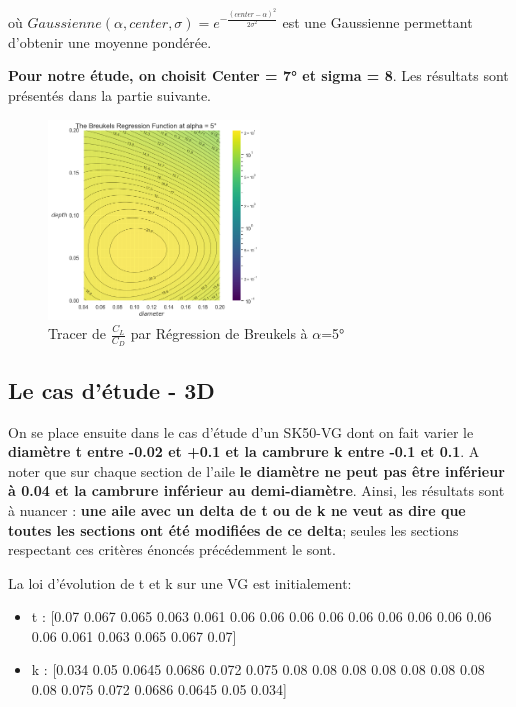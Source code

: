 \documentclass[conference]{IEEEtran}
\begin{document}
    où $Gaussienne(\alpha, center, \sigma) = e^{-\frac{(center - \alpha)^2}{2\sigma^2}}$ est une Gaussienne permettant d'obtenir une moyenne pondérée. 

\textbf{Pour notre étude, on choisit Center = 7° et sigma = 8}. Les résultats sont présentés dans la partie suivante.
\begin{figure}[H]
    \centering
    \includegraphics[width=0.5\textwidth]{Pics/breukels.png}  
    \caption{Tracer de $\frac{C_L}{C_D}$ par Régression de Breukels à $\alpha$=5°}
    \label{fig:breukels}
\end{figure}


\subsection{Le cas d'étude - 3D} 

On se place ensuite dans le cas d'étude d'un SK50-VG dont on fait varier le \textbf{diamètre t entre -0.02 et +0.1 et la cambrure k entre -0.1 et 0.1}. A noter que sur chaque section de l'aile \textbf{le diamètre ne peut pas être inférieur à 0.04 et la cambrure inférieur au demi-diamètre}. Ainsi, les résultats sont à nuancer : \textbf{une aile avec un delta de t ou de k ne veut as dire que toutes les sections ont été modifiées de ce delta}; seules les sections respectant ces critères énoncés précédemment le sont.

La loi d'évolution de t et k sur une VG est initialement:  
\begin{itemize}
    \item t : [0.07 0.067 0.065 0.063 0.061 0.06 0.06  0.06 0.06 0.06  0.06  0.06 0.06 0.06  0.06 0.061 0.063 0.065 0.067 0.07]
    \item k : [0.034 0.05 0.0645 0.0686 0.072 0.075 0.08 0.08 0.08 0.08      0.08 0.08 0.08 0.08 0.075 0.072 0.0686 0.0645 0.05 0.034]
\end{itemize}
\end{document}

